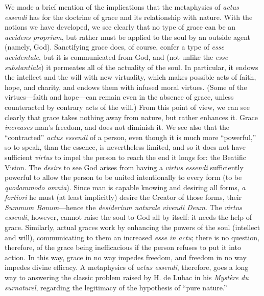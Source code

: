 We made a brief mention of the implications that the metaphysics of \emph{actus essendi} has for the doctrine of grace and its relationship with nature. With the notions we have developed, we see clearly that no type of grace can be an \emph{accidens proprium}, but rather must be applied to the soul by an outside agent (namely, God).
Sanctifying grace does, of course, confer a type of \emph{esse accidentale}, but it is communicated from God, and (not unlike the \emph{esse substantiale}) it permeates all of the actuality of the soul.
In particular, it endows the intellect and the will with new virtuality, which makes possible acts of faith, hope, and charity, and endows them with infused moral virtues.
(Some of the virtues---faith and hope---can remain even in the absence of grace, unless counteracted by contrary acts of the will.)
From this point of view, we can see clearly that grace takes nothing away from nature, but rather enhances it.
Grace \emph{increases} man's freedom, and does not diminish it.
We see also that the ``contracted'' \emph{actus essendi} of a person, even though it is much more ``powerful,'' so to speak, than the essence, is nevertheless limited, and so it does not have sufficient \emph{virtus} to impel the person to reach the end it longs for: the Beatific Vision.
The \emph{desire} to see God arises from having a \emph{virtus essendi} sufficiently powerful to allow the person to be united intentionally to every form (to be \emph{quodammodo omnia}). Since man is capable knowing and desiring all forms, \emph{a fortiori} he must (at least implicitly) desire the Creator of those forms, their \emph{Summum Bonum}---hence the \emph{desiderium naturale vivendi Deum}.
The \emph{virtus essendi}, however, cannot raise the soul to God all by itself: it needs the help of grace. Similarly, actual graces work by enhancing the powers of the soul (intellect and will), communicating to them an increased \emph{esse in actu}; there is no question, therefore, of the grace being inefficacious if the person refuses to put it into action. In this way, grace in no way impedes freedom, and freedom in no way impedes divine efficacy.
A metaphysics of \emph{actus essendi}, therefore, goes a long way to answering the classic problem raised by H. de Lubac in his \emph{Mystère du surnaturel}, regarding the legitimacy of the hypothesis of ``pure nature.''\,%
%
